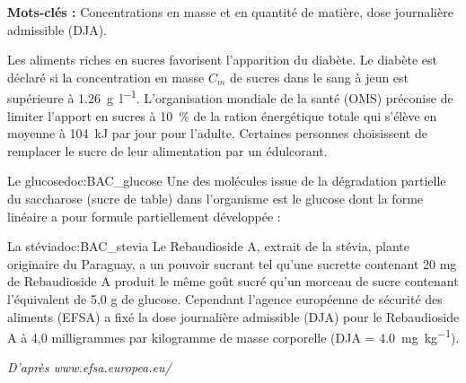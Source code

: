 



\newpage
{}

\textbf{Mots-clés :} Concentrations en masse et en quantité de matière, dose journalière
admissible (DJA).
\medskip

Les aliments riches en sucres favorisent l'apparition du diabète. Le diabète est déclaré si la
concentration en masse $C_m$ de sucres dans le sang à jeun est supérieure à \qty{1,26}{\g\per\litre}.
L'organisation mondiale de la santé (OMS) préconise de limiter l'apport en sucres à \qty{10}{\percent} de la ration énergétique totale qui s'élève en moyenne à \qty{104}{\kilo\joule} par jour pour l'adulte.
Certaines personnes choisissent de remplacer le sucre de leur alimentation par un édulcorant.

\begin{doc}{Le glucose}{doc:BAC_glucose}
  Une des molécules issue de la dégradation partielle du saccharose (sucre de table)
  dans l'organisme est le glucose dont la forme linéaire a pour formule partiellement développée :
  \begin{center}
  \end{center}
\end{doc}

\begin{doc}{La stévia}{doc:BAC_stevia}
  Le Rebaudioside A, extrait de la stévia, plante originaire du Paraguay, a un pouvoir sucrant tel
  qu'une sucrette contenant 20 mg de Rebaudioside A produit le même goût sucré qu'un morceau
  de sucre contenant l'équivalent de 5,0 g de glucose.
  Cependant l'agence européenne de sécurité des aliments (EFSA)
  a fixé la dose journalière admissible (DJA)
  pour le Rebaudioside A à 4,0 milligrammes par kilogramme de masse corporelle
  (DJA = \qty{4,0}{\milli\g\per\kg}).

  \begin{flushright}
    \textit{D'après www.efsa.europea.eu/}
  \end{flushright}
\end{doc}

